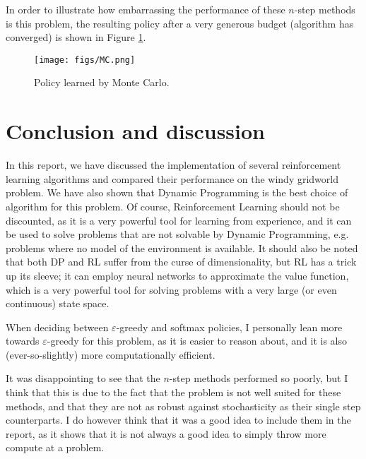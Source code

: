 \documentclass{article}
\begin{document}
\newpage

In order to illustrate how embarrassing the performance of these $n$-step methods is this problem, the resulting policy after a very generous budget (algorithm has converged) is shown in Figure \ref{fig:policyn}.

\begin{figure}[htbp]
    \centering
    \texttt{[image: figs/MC.png]}
    \caption{Policy learned by Monte Carlo.}
    \label{fig:policyn}
\end{figure}

\newpage

\section{Conclusion and discussion}
\label{sec:concdisc}

In this report, we have discussed the implementation of several reinforcement learning algorithms and compared their performance on the windy gridworld problem.
We have also shown that Dynamic Programming is the best choice of algorithm for this problem.
Of course, Reinforcement Learning should not be discounted, as it is a very powerful tool for learning from experience, and it can be used to solve problems that are not solvable by Dynamic Programming, e.g. problems where no model of the environment is available.
It should also be noted that both DP and RL suffer from the curse of dimensionality, but RL has a trick up its sleeve; it can employ neural networks to approximate the value function, which is a very powerful tool for solving problems with a very large (or even continuous) state space.

When deciding between $\varepsilon$-greedy and softmax policies, I personally lean more towards $\varepsilon$-greedy for this problem, as it is easier to reason about, and it is also (ever-so-slightly) more computationally efficient.

It was disappointing to see that the $n$-step methods performed so poorly, but I think that this is due to the fact that the problem is not well suited for these methods, and that they are not as robust against stochasticity as their single step counterparts.
I do however think that it was a good idea to include them in the report, as it shows that it is not always a good idea to simply throw more compute at a problem.



\end{document}
